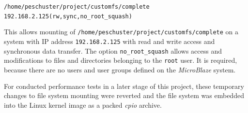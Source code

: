 \texttt{/home/peschuster/project/customfs/complete	192.168.2.125(rw,sync,no\_root\_squash)}

This allows mounting of \texttt{/home/peschuster/project/customfs/complete} on a system with IP address \texttt{192.168.2.125} with read and write access and synchronous data transfer. The option \texttt{no\_root\_squash} allows access and modifications to files and directories belonging to the \texttt{root} user. It is required, because there are no users and user groups defined on the \textit{MicroBlaze} system.

For conducted performance tests in a later stage of this project, these temporary changes to file system mounting were reverted and the file system was embedded into the Linux kernel image as a packed \textit{cpio} archive.
